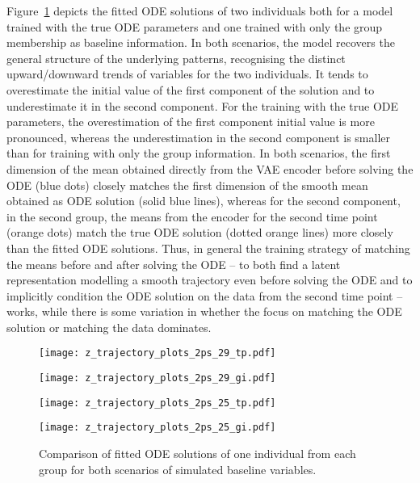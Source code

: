 Figure~\ref{fig:apps_individual_comparison_tp_gi_2pslinear} depicts the fitted ODE solutions of two individuals both for a model trained with the true ODE parameters and one trained with only the group membership as baseline information. In both scenarios, the model recovers the general structure of the underlying patterns, recognising the distinct upward/downward trends of variables for the two individuals. 
It tends to overestimate the initial value of the first component of the solution and to underestimate it in the second component. For the training with the true ODE parameters, the overestimation of the first component initial value is more pronounced, whereas the underestimation in the second component is smaller than for training with only the group information. 
In both scenarios, the first dimension of the mean obtained directly from the VAE encoder before solving the ODE (blue dots) closely matches the first dimension of the smooth mean obtained as ODE solution (solid blue lines), whereas for the second component, in the second group, the means from the encoder for the second time point (orange dots) match the true ODE solution (dotted orange lines) more closely than the fitted ODE solutions. 
Thus, in general the training strategy 
of matching the means before and after solving the ODE -- to both find a latent representation modelling a smooth trajectory even before solving the ODE and to implicitly condition the ODE solution on the data from the second time point -- works, while there is some variation in whether the focus on matching the ODE solution or matching the data dominates. 
\begin{figure}
	\centering
	\begin{minipage}{\linewidth}
		\begin{minipage}{.5\textwidth}
			\centering				\texttt{[image: z\_trajectory\_plots\_2ps\_29\_tp.pdf]}
		\end{minipage}\begin{minipage}{.5\textwidth}
			\centering
			\texttt{[image: z\_trajectory\_plots\_2ps\_29\_gi.pdf]}
		\end{minipage}
	\end{minipage}
	\begin{minipage}{\linewidth}
		\begin{minipage}{.5\textwidth}
			\centering
			\texttt{[image: z\_trajectory\_plots\_2ps\_25\_tp.pdf]}
		\end{minipage}\begin{minipage}{.5\textwidth}
			\centering
			\texttt{[image: z\_trajectory\_plots\_2ps\_25\_gi.pdf]}
		\end{minipage}
	\end{minipage}
\caption{Comparison of fitted ODE solutions of one individual from each group for both scenarios of simulated baseline variables.}
\label{fig:apps_individual_comparison_tp_gi_2pslinear}
\end{figure}

